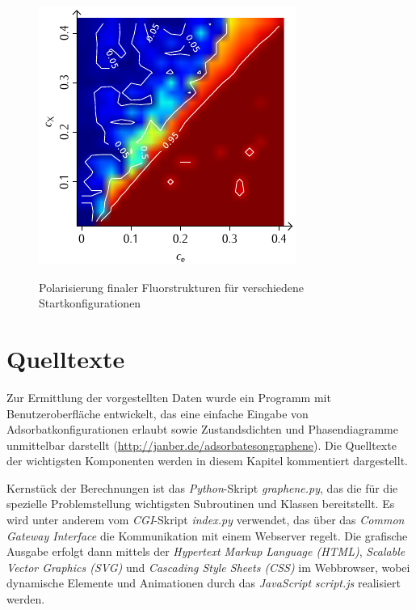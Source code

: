 \documentclass[a4paper, 10pt, twoside, openany]{book} %
\begin{document}
\begin{figure}
\begin{minipage}[t]{0.48\textwidth}
        \label{F_individual_P}
    \end{minipage}
    \hfill
    \begin{minipage}[t]{0.48\textwidth}
        \includegraphics[width=\textwidth]{Abbildungen/Phasendiagramme/Konturen/F_penalty_individual_P.pdf}
        \label{F_penalty_individual_P}
    \end{minipage}
    \caption[Polarisierung finaler Fluorstrukturen]{Polarisierung finaler Fluorstrukturen für verschiedene Startkonfigurationen}
    \label{F_P}
\end{figure}

\chapter{Quelltexte}

Zur Ermittlung der vorgestellten Daten wurde ein Programm mit Benutzeroberfläche entwickelt, das eine einfache Eingabe von Adsorbatkonfigurationen erlaubt sowie Zustandsdichten und Phasendiagramme unmittelbar darstellt (\url{http://janber.de/adsorbatesongraphene}). Die Quelltexte der wichtigsten Komponenten werden in diesem Kapitel kommentiert dargestellt.

Kernstück der Berechnungen ist das \emph{Python}-Skript \emph{graphene.py}, das die für die spezielle Problemstellung wichtigsten Subroutinen und Klassen bereitstellt. Es wird unter anderem vom \emph{CGI}-Skript \emph{index.py} verwendet, das über das \emph{Common Gateway Interface} die Kommunikation mit einem Webserver regelt. Die grafische Ausgabe erfolgt dann mittels der \emph{Hypertext Markup Language (HTML)}, \emph{Scalable Vector Graphics (SVG)} und \emph{Cascading Style Sheets (CSS)} im Webbrowser, wobei dynamische Elemente und Animationen durch das \emph{JavaScript} \emph{script.js} realisiert werden.
\end{document}
